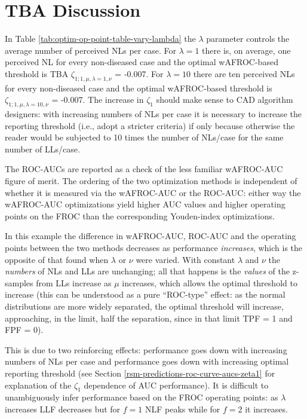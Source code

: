 \documentclass[
]{book}
\begin{document}
\hypertarget{optim-op-point-discussion}{%
\section{TBA Discussion}\label{optim-op-point-discussion}}

In Table \ref{tab:optim-op-point-table-vary-lambda} the \(\lambda\) parameter controls the average number of perceived NLs per case. For \(\lambda = 1\) there is, on average, one perceived NL for every non-diseased case and the optimal wAFROC-based threshold is TBA \(\zeta_{1;1,\mu, \lambda = 1, \nu}\) = -0.007. For \(\lambda = 10\) there are ten perceived NLs for every non-diseased case and the optimal wAFROC-based threshold is \(\zeta_{1;1,\mu, \lambda = 10, \nu}\) = -0.007. The increase in \(\zeta_1\) should make sense to CAD algorithm designers: with increasing numbers of NLs per case it is necessary to increase the reporting threshold (i.e., adopt a stricter criteria) if only because otherwise the reader would be subjected to 10 times the number of NLs/case for the same number of LLs/case.

The ROC-AUCs are reported as a check of the less familiar wAFROC-AUC figure of merit. The ordering of the two optimization methods is independent of whether it is measured via the wAFROC-AUC or the ROC-AUC: either way the wAFROC-AUC optimizations yield higher AUC values and higher operating points on the FROC than the corresponding Youden-index optimizations.

In this example the difference in wAFROC-AUC, ROC-AUC and the operating points between the two methods decreases as performance \emph{increases}, which is the opposite of that found when \(\lambda\) or \(\nu\) were varied. With constant \(\lambda\) and \(\nu\) the \emph{numbers} of NLs and LLs are unchanging; all that happens is the \emph{values} of the z-samples from LLs increase as \(\mu\) increases, which allows the optimal threshold to increase (this can be understood as a pure ``ROC-type'' effect: as the normal distributions are more widely separated, the optimal threshold will increase, approaching, in the limit, half the separation, since in that limit TPF = 1 and FPF = 0).

This is due to two reinforcing effects: performance goes down with increasing numbers of NLs per case and performance goes down with increasing optimal reporting threshold (see Section \ref{rsm-predictions-roc-curve-aucs-zeta1} for explanation of the \(\zeta_1\) dependence of AUC performance). It is difficult to unambiguously infer performance based on the FROC operating points: as \(\lambda\) increases LLF decreases but for \(f = 1\) NLF peaks while for \(f = 2\) it increases.
\end{document}
